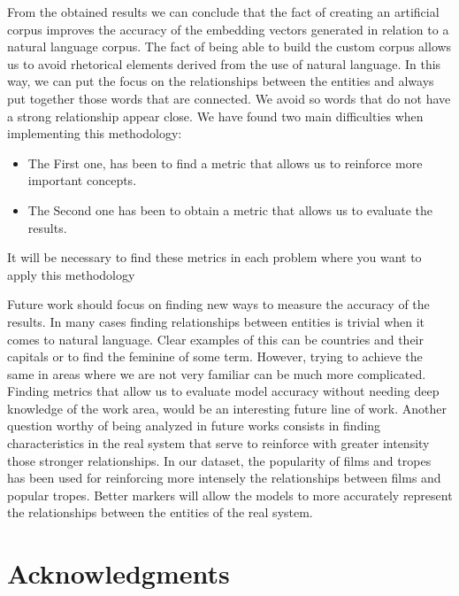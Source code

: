 \documentclass[letterpaper]{article}
\begin{document}
	From the obtained results we can conclude that the fact of creating an artificial corpus improves the accuracy of the embedding vectors generated in relation to a natural language corpus. The fact of being able to build the custom corpus allows us to avoid rhetorical elements derived from the use of natural language. In this way, we can put the focus on the relationships between the entities and always put together those words that are connected. We avoid so words that do not have a strong relationship appear close. 
	We have found two main difficulties when implementing this methodology:
	\begin{itemize}
	\item The First one, has been to find a metric that allows us to reinforce more important concepts. 
	\item The Second one has been to obtain a metric that allows us to evaluate the results.
	\end{itemize}
	It will be necessary to find these metrics in each problem where you want to apply this methodology
	
	Future work should focus on finding new ways to measure the accuracy of the results. In many cases finding relationships between entities is trivial when it comes to natural language. Clear examples of this can be countries and their capitals or to find the feminine of some term. However, trying to achieve the same in areas where we are not very familiar can be much more complicated. Finding metrics that allow us to evaluate model accuracy without needing deep knowledge of the work area, would be an interesting future line of work. Another question worthy of being analyzed in future works consists in finding characteristics in the real system that serve to reinforce with greater intensity those stronger relationships. In our dataset, the popularity of films and tropes has been used for reinforcing more intensely the relationships between films and popular tropes. Better markers will allow the models to more accurately represent the relationships between the entities of the real system.
	
	
	\section{Acknowledgments}
	
	
	
	
\end{document}
